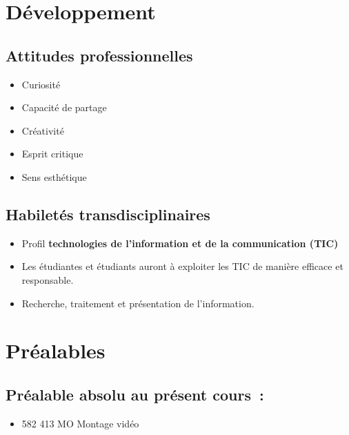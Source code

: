 \documentclass[
]{book}
\providecommand{\tightlist}{%
  \setlength{\itemsep}{0pt}\setlength{\parskip}{0pt}}
\begin{document}
\hypertarget{duxe9veloppement}{%
\section{Développement}\label{duxe9veloppement}}

\hypertarget{attitudes-professionnelles}{%
\subsection{Attitudes professionnelles}\label{attitudes-professionnelles}}

\begin{itemize}
\tightlist
\item
  Curiosité
\item
  Capacité de partage
\item
  Créativité
\item
  Esprit critique
\item
  Sens esthétique
\end{itemize}

\hypertarget{habiletuxe9s-transdisciplinaires}{%
\subsection{Habiletés transdisciplinaires}\label{habiletuxe9s-transdisciplinaires}}

\begin{itemize}
\tightlist
\item
  Profil \textbf{technologies de l'information et de la communication (TIC)}
\item
  Les étudiantes et étudiants auront à exploiter les TIC de manière efficace et responsable.
\item
  Recherche, traitement et présentation de l'information.
\end{itemize}

\hypertarget{pruxe9alables}{%
\section{Préalables}\label{pruxe9alables}}

\hypertarget{pruxe9alable-absolu-au-pruxe9sent-cours}{%
\subsection{Préalable absolu au présent cours~:}\label{pruxe9alable-absolu-au-pruxe9sent-cours}}

\begin{itemize}
\tightlist
\item
  582 413 MO Montage vidéo
\end{itemize}
\end{document}
